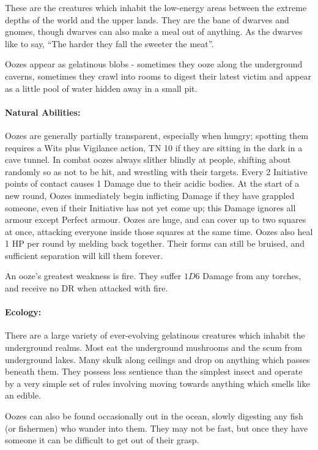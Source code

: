 \begin{multicols}{2}

These are the creatures which inhabit the low-energy areas between the extreme depths of the world and the upper lands.
They are the bane of dwarves and gnomes, though dwarves can also make a meal out of anything.
As the dwarves like  to say, ``The harder they fall the sweeter the meat''.

\label{ooze}
Oozes appear as gelatinous blobs - sometimes they ooze along the underground caverns, sometimes they crawl into rooms to digest their latest victim and appear as a little pool of water hidden away in a small pit.

\paragraph{Natural Abilities:} Oozes are generally partially transparent, especially when hungry; spotting them requires a Wits plus Vigilance action, TN 10 if they are sitting in the dark in a cave tunnel.
In combat oozes always slither blindly at people, shifting about randomly so as not to be hit, and wrestling with their targets.
Every 2 Initiative points of contact causes 1 Damage due to their acidic bodies.
At the start of a new round, Oozes immediately begin inflicting Damage if they have grappled someone, even if their Initiative has not yet come up; this Damage ignores all armour except Perfect armour.
Oozes are huge, and can cover up to two squares at once, attacking everyone inside those squares at the same time.
Oozes also heal 1 HP per round by melding back together.
Their forms can still be bruised, and sufficient separation will kill them forever.

An ooze's greatest weakness is fire.
They suffer $1D6$ Damage from any torches, and receive no DR when attacked with fire.

\paragraph{Ecology:} There are a large variety of ever-evolving gelatinous creatures which inhabit the underground realms.  Most eat the underground mushrooms and the scum from underground lakes.  Many skulk along ceilings and drop on anything which passes beneath them.  They possess less sentience than the simplest insect and operate by a very simple set of rules involving moving towards anything which smells like an edible.

Oozes can also be found occasionally out in the ocean, slowly digesting any fish (or fishermen) who wander into them.
They may not be fast, but once they have someone it can be difficult to get out of their grasp.


\end{multicols}
